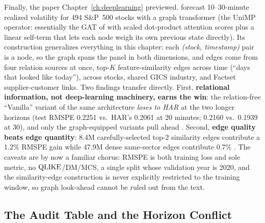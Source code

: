 Finally, the paper Chapter~\ref{ch:deeplearning} previewed. \citet{ChenRobert2022} forecast 10--30-minute realized volatility for 494 S\&P~500 stocks with a graph transformer (the UniMP operator: essentially the GAT of  with scaled dot-product attention scores plus a linear self-term that lets each node weigh its own previous state directly). Its construction generalizes everything in this chapter: each \emph{(stock, timestamp)} pair is a node, so the graph spans the panel in both dimensions, and edges come from four relation sources at once, top-$K$ feature-similarity edges across time (``days that looked like today''), across stocks, shared GICS industry, and Factset supplier-customer links. Two findings transfer directly. First, \textbf{relational information, not deep-learning machinery, earns the win}: the relation-free ``Vanilla'' variant of the same architecture \emph{loses to HAR} at the two longer horizons (test RMSPE 0.2251 vs.\ HAR's 0.2061 at 20 minutes; 0.2160 vs.\ 0.1939 at 30), and only the graph-equipped variants pull ahead \citep[Table~4, p.~9]{ChenRobert2022}. Second, \textbf{edge quality beats edge quantity}: 8.4M carefully-selected top-2 similarity edges contribute a 1.2\% RMSPE gain while 47.9M dense same-sector edges contribute 0.7\% \citep[\S5.4, Table~3]{ChenRobert2022}. The caveats are by now a familiar chorus: RMSPE is both training loss and sole metric, no $\operatorname{QLIKE}$/DM/MCS, a single split whose validation year is 2020, and the similarity-edge construction is never explicitly restricted to the training window, so graph look-ahead cannot be ruled out from the text.

\subsection{The Audit Table and the Horizon Conflict}\label{sec:gnn:audit}

